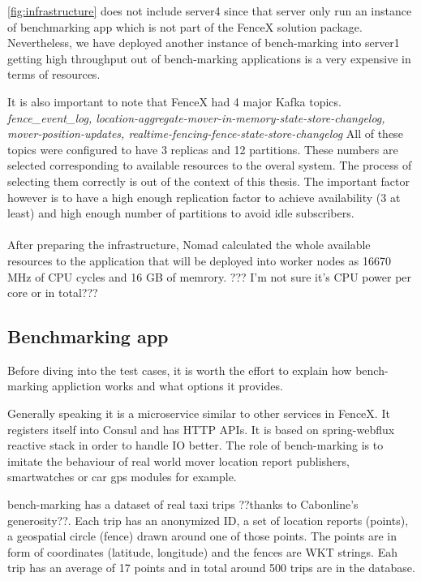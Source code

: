 \documentclass[a4]{report}
\begin{document}
    \ref{fig:infrastructure} does not include server4 since that server only run an instance of benchmarking app
    which is not part of the FenceX solution package.
    Nevertheless, we have deployed another instance of bench-marking into server1 getting high throughput out of
    bench-marking applications is a very expensive in terms of resources.

    It is also important to note that FenceX had 4 major Kafka topics.
    \textit{fence\_event\_log, location-aggregate-mover-in-memory-state-store-changelog, mover-position-updates,
        realtime-fencing-fence-state-store-changelog}
    All of these topics were configured to have 3 replicas and 12 partitions.
    These numbers are selected corresponding to available resources to the overal system.
    The process of selecting them correctly is out of the context of this thesis.
    The important factor however is to have a high enough replication factor to achieve availability (3 at least) and
    high enough number of partitions to avoid idle subscribers.

    \paragraph{}
    After preparing the infrastructure, Nomad calculated the whole available resources to the application that will
    be deployed into worker nodes as 16670 MHz of CPU cycles and 16 GB of memrory.
    ??? I'm not sure it's CPU power per core or in total???

    \subsection{Benchmarking app}
    Before diving into the test cases, it is worth the effort to explain how bench-marking appliction works and what
    options it provides.

    Generally speaking it is a microservice similar to other services in FenceX.
    It registers itself into Consul and has HTTP APIs.
    It is based on spring-webflux reactive stack in order to handle IO better.
    The role of bench-marking is to imitate the behaviour of real world mover location report publishers,
    smartwatches or car gps modules for example.

    bench-marking has a dataset of real taxi trips ??thanks to Cabonline's generosity??.
    Each trip has an anonymized ID, a set of location reports (points), a geospatial circle (fence) drawn around one of those points.
    The points are in form of coordinates (latitude, longitude) and the fences are WKT strings.
    Eah trip has an average of 17 points and in total around 500 trips are in the database.
\end{document}
